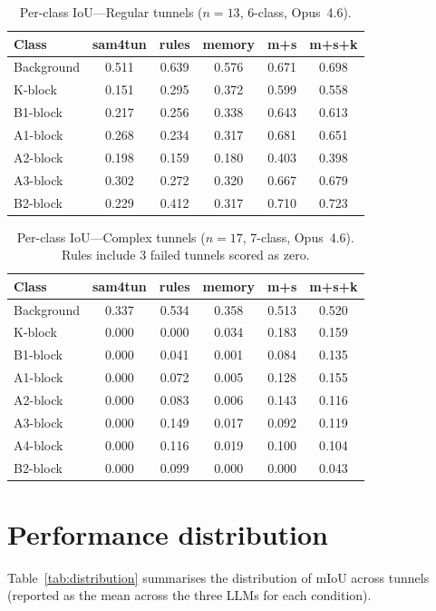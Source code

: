 \begin{table}[ht]
\caption{Per-class IoU---Regular tunnels ($n=13$, 6-class, Opus~4.6).}\label{tab:perclass-regular}
\begin{tabular*}{\tblwidth}{@{} l c c c c c @{}}
\toprule
Class & sam4tun & rules & memory & m+s & m+s+k \\
\midrule
Background & 0.511 & 0.639 & 0.576 & 0.671 & 0.698 \\
K-block & 0.151 & 0.295 & 0.372 & 0.599 & 0.558 \\
B1-block & 0.217 & 0.256 & 0.338 & 0.643 & 0.613 \\
A1-block & 0.268 & 0.234 & 0.317 & 0.681 & 0.651 \\
A2-block & 0.198 & 0.159 & 0.180 & 0.403 & 0.398 \\
A3-block & 0.302 & 0.272 & 0.320 & 0.667 & 0.679 \\
B2-block & 0.229 & 0.412 & 0.317 & 0.710 & 0.723 \\
\bottomrule
\end{tabular*}
\end{table}

\begin{table}[ht]
\caption{Per-class IoU---Complex tunnels ($n=17$, 7-class, Opus~4.6). Rules include 3 failed tunnels scored as zero.}\label{tab:perclass-complex}
\begin{tabular*}{\tblwidth}{@{} l c c c c c @{}}
\toprule
Class & sam4tun & rules & memory & m+s & m+s+k \\
\midrule
Background & 0.337 & 0.534 & 0.358 & 0.513 & 0.520 \\
K-block & 0.000 & 0.000 & 0.034 & 0.183 & 0.159 \\
B1-block & 0.000 & 0.041 & 0.001 & 0.084 & 0.135 \\
A1-block & 0.000 & 0.072 & 0.005 & 0.128 & 0.155 \\
A2-block & 0.000 & 0.083 & 0.006 & 0.143 & 0.116 \\
A3-block & 0.000 & 0.149 & 0.017 & 0.092 & 0.119 \\
A4-block & 0.000 & 0.116 & 0.019 & 0.100 & 0.104 \\
B2-block & 0.000 & 0.099 & 0.000 & 0.000 & 0.043 \\
\bottomrule
\end{tabular*}
\end{table}

\section{Performance distribution}\label{app:distribution}
Table~\ref{tab:distribution} summarises the distribution of mIoU across tunnels (reported as the mean across the three LLMs for each condition).

